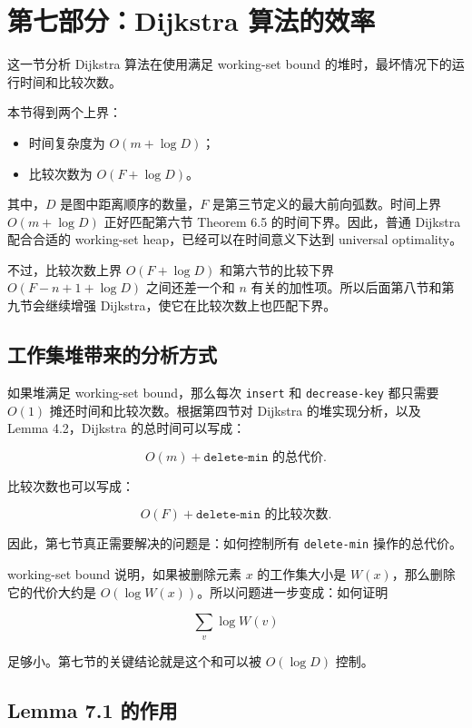 \documentclass[UTF8]{ctexart}
\begin{document}
\section*{第七部分：Dijkstra 算法的效率}

这一节分析 Dijkstra 算法在使用满足 working-set bound 的堆时，最坏情况下的运行时间和比较次数。

本节得到两个上界：

\begin{itemize}
  \item 时间复杂度为 \(O(m+\log D)\)；
  \item 比较次数为 \(O(F+\log D)\)。
\end{itemize}

其中，\(D\) 是图中距离顺序的数量，\(F\) 是第三节定义的最大前向弧数。时间上界 \(O(m+\log D)\) 正好匹配第六节 Theorem 6.5 的时间下界。因此，普通 Dijkstra 配合合适的 working-set heap，已经可以在时间意义下达到 universal optimality。

不过，比较次数上界 \(O(F+\log D)\) 和第六节的比较下界 \(O(F-n+1+\log D)\) 之间还差一个和 \(n\) 有关的加性项。所以后面第八节和第九节会继续增强 Dijkstra，使它在比较次数上也匹配下界。

\subsection*{工作集堆带来的分析方式}

如果堆满足 working-set bound，那么每次 \texttt{insert} 和 \texttt{decrease-key} 都只需要 \(O(1)\) 摊还时间和比较次数。根据第四节对 Dijkstra 的堆实现分析，以及 Lemma 4.2，Dijkstra 的总时间可以写成：

\[
O(m) + \texttt{delete-min 的总代价}.
\]

比较次数也可以写成：

\[
O(F) + \texttt{delete-min 的比较次数}.
\]

因此，第七节真正需要解决的问题是：如何控制所有 \texttt{delete-min} 操作的总代价。

working-set bound 说明，如果被删除元素 \(x\) 的工作集大小是 \(W(x)\)，那么删除它的代价大约是 \(O(\log W(x))\)。所以问题进一步变成：如何证明

\[
\sum_v \log W(v)
\]

足够小。第七节的关键结论就是这个和可以被 \(O(\log D)\) 控制。

\subsection*{Lemma 7.1 的作用}
\end{document}
